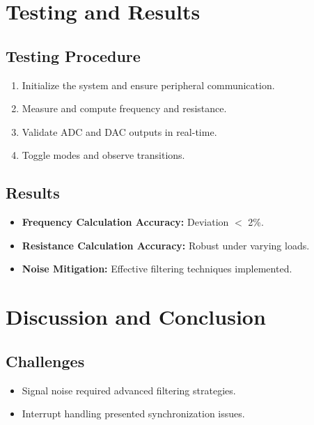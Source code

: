 \documentclass[12pt]{article}
\begin{document}


\tableofcontents
\newpage







\newpage

\section{Testing and Results}
\subsection{Testing Procedure}
\begin{enumerate}[leftmargin=2em]
    \item Initialize the system and ensure peripheral communication.
    \item Measure and compute frequency and resistance.
    \item Validate ADC and DAC outputs in real-time.
    \item Toggle modes and observe transitions.
\end{enumerate}

\subsection{Results}
\begin{itemize}[leftmargin=2em]
    \item \textbf{Frequency Calculation Accuracy:} Deviation $<$ 2\%.
    \item \textbf{Resistance Calculation Accuracy:} Robust under varying loads.
    \item \textbf{Noise Mitigation:} Effective filtering techniques implemented.
\end{itemize}

\section{Discussion and Conclusion}
\subsection{Challenges}
\begin{itemize}[leftmargin=2em]
    \item Signal noise required advanced filtering strategies.
    \item Interrupt handling presented synchronization issues.
\end{itemize}
\end{document}

